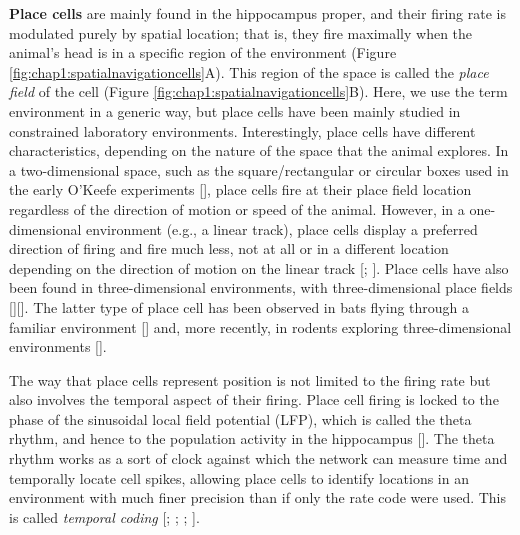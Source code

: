 \textbf{Place cells} are mainly found in the hippocampus proper, and their firing rate is modulated purely by spatial location; that is, they fire maximally when the animal's head is in a specific region of the environment (Figure \ref{fig:chap1:spatialnavigationcells}A). 
This region of the space is called the \textit{place field} of the cell (Figure \ref{fig:chap1:spatialnavigationcells}B).  
Here, we use the term environment in a generic way, but place cells have been mainly studied in constrained laboratory environments.
Interestingly, place cells have different characteristics, depending on the nature of the space that the animal explores.
In a two-dimensional space, such as the square/rectangular or circular boxes used in the early O'Keefe experiments [\cite{okeefe1976}], place cells fire at their place field location regardless of the direction of motion or speed of the animal.
However, in a one-dimensional environment (e.g., a linear track), place cells display a preferred direction of firing and fire much less, not at all or in a different location depending on the direction of motion on the linear track [\cite{mcnaughton1983}; \cite{okeefe1993}].
Place cells have also been found in three-dimensional environments, with three-dimensional place fields [\cite{yartsev2013}][\cite{grieves2020}].
The latter type of place cell has been observed in bats flying through a familiar environment [\cite{yartsev2013}] and, more recently, in rodents exploring three-dimensional environments [\cite{grieves2020}].

The way that place cells represent position is not limited to the firing rate but also involves the temporal aspect of their firing. 
Place cell firing is locked to the phase of the sinusoidal local field potential (LFP), which is called the theta rhythm, and hence to the population activity in the hippocampus [\cite{okeefe1993}].
The theta rhythm works as a sort of clock against which the network can measure time and temporally locate cell spikes, allowing place cells to identify locations in an environment with much finer precision than if only the rate code were used.
This is called \textit{temporal coding} [\cite{okeefe1993}; \cite{huxter2003}; \cite{buzsaki2004}; \cite{buzsaki2002}].

